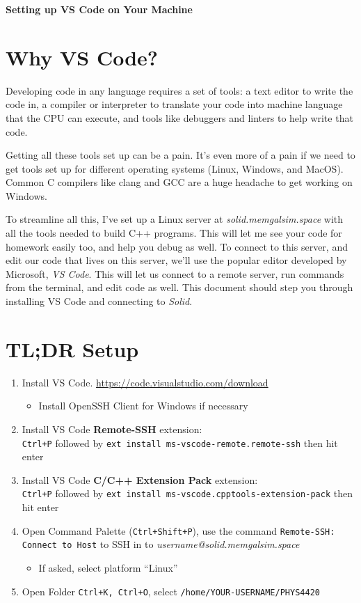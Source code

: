 \documentclass[11pt]{article}
\begin{document}
\begin{center}
\textbf{\Large Setting up VS Code on Your Machine}\\
\end{center}
\section*{Why VS Code?}
Developing code in any language requires a set of tools: a text editor to write the code in, a compiler or interpreter 
to translate your code into machine language that the CPU can execute, and tools like debuggers and linters to help write that
code.  

Getting all these tools set up can be a pain.  It's even more of a pain if we need to get tools set up for different operating
systems (Linux, Windows, and MacOS).  Common C compilers like clang and GCC are a huge headache to get working on Windows.

To streamline all this, I've set up a Linux server at \textit{solid.memgalsim.space} with all the tools needed to build C++ programs.
This will let me see your code for homework easily too, and help you debug as well.  To connect to this server, and edit our code that
lives on this server, we'll use the popular editor developed by Microsoft, \textit{VS Code}.  This will let us connect to a remote 
server, run commands from the terminal, and edit code as well.  This document should step you through installing VS Code and connecting to 
\textit{Solid}.

\section*{TL;DR Setup}
\begin{enumerate}
    \item Install VS Code. \href{https://code.visualstudio.com/download}{https://code.visualstudio.com/download}
    \begin{itemize}
        \item Install OpenSSH Client for Windows if necessary
    \end{itemize}
    \item Install VS Code \textbf{Remote-SSH} extension: \\ \texttt{Ctrl+P} followed by \texttt{ext install ms-vscode-remote.remote-ssh} then hit enter
    \item Install VS Code \textbf{C/C++ Extension Pack} extension: \\ \texttt{Ctrl+P} followed by \texttt{ext install ms-vscode.cpptools-extension-pack} then hit enter
    \item Open Command Palette (\texttt{Ctrl+Shift+P}), use the command \texttt{Remote-SSH: Connect to Host} to SSH in to \textit{username@solid.memgalsim.space}
    \begin{itemize}
        \item If asked, select platform ``Linux''
    \end{itemize}
    \item Open Folder \texttt{Ctrl+K, Ctrl+O}, select \texttt{/home/YOUR-USERNAME/PHYS4420}
\end{enumerate}
\end{document}
